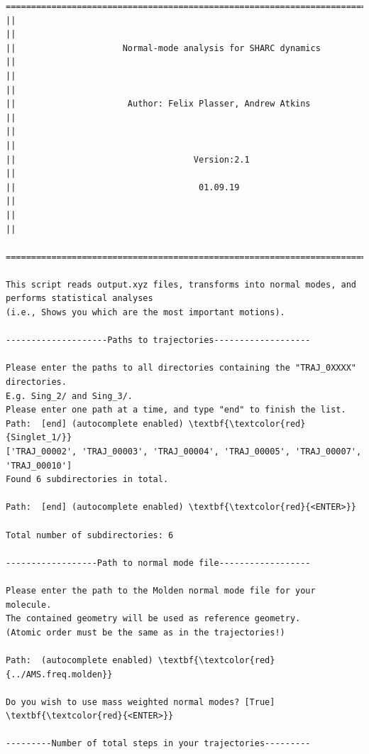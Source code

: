 \documentclass[a4paper,11pt,DIV=15,openany]{scrbook}
\begin{document}
\begin{oframed}
\footnotesize\begin{Verbatim}[commandchars=\\\{\}]
  ================================================================================
||                                                                                ||
||                     Normal-mode analysis for SHARC dynamics                    ||
||                                                                                ||
||                      Author: Felix Plasser, Andrew Atkins                      ||
||                                                                                ||
||                                   Version:2.1                                  ||
||                                    01.09.19                                    ||
||                                                                                ||
  ================================================================================

This script reads output.xyz files, transforms into normal modes, and performs statistical analyses 
(i.e., Shows you which are the most important motions).
  
--------------------Paths to trajectories-------------------

Please enter the paths to all directories containing the "TRAJ_0XXXX" directories.
E.g. Sing_2/ and Sing_3/. 
Please enter one path at a time, and type "end" to finish the list.
Path:  [end] (autocomplete enabled) \textbf{\textcolor{red}{Singlet_1/}}
['TRAJ_00002', 'TRAJ_00003', 'TRAJ_00004', 'TRAJ_00005', 'TRAJ_00007', 'TRAJ_00010']
Found 6 subdirectories in total.

Path:  [end] (autocomplete enabled) \textbf{\textcolor{red}{<ENTER>}}

Total number of subdirectories: 6

------------------Path to normal mode file------------------

Please enter the path to the Molden normal mode file for your molecule. 
The contained geometry will be used as reference geometry.
(Atomic order must be the same as in the trajectories!)

Path:  (autocomplete enabled) \textbf{\textcolor{red}{../AMS.freq.molden}}

Do you wish to use mass weighted normal modes? [True] \textbf{\textcolor{red}{<ENTER>}}

---------Number of total steps in your trajectories---------


\end{Verbatim}
\end{oframed}
\end{document}
